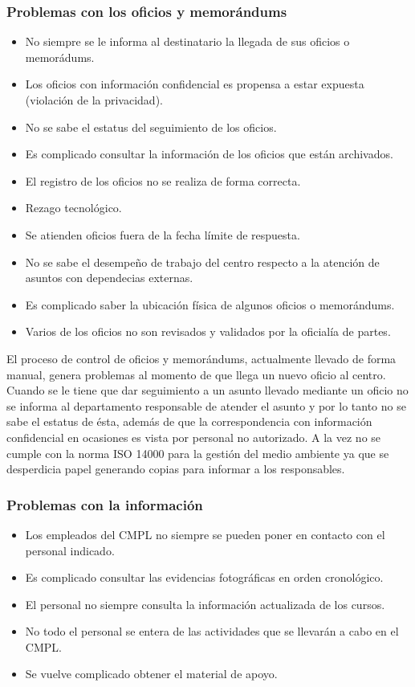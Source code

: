 		\subsubsection{Problemas con los oficios y memorándums}
\begin{itemize}
	\item No siempre se le informa al destinatario la llegada de sus oficios o memorádums.
	\item Los oficios con información confidencial es propensa a estar expuesta (violación de la privacidad).
	\item No se sabe el estatus del seguimiento de los oficios.
	\item Es complicado consultar la información de los oficios que están archivados.
	\item El registro de los oficios no se realiza de forma correcta.
	\item Rezago tecnológico.
	\item Se atienden oficios fuera de la fecha límite de respuesta.
	\item No se sabe el desempeño de trabajo del centro respecto a la atención de asuntos con dependecias externas.
	\item Es complicado saber la ubicación física de algunos oficios o memorándums. %
	\item Varios de los oficios no son revisados y validados por la oficialía de partes.
	\end{itemize}
El proceso de control de oficios y memorándums, actualmente llevado de forma manual, genera problemas al momento de que llega un nuevo oficio al centro. Cuando se le tiene que dar seguimiento a un asunto llevado mediante un oficio no se informa al departamento responsable de atender el asunto y por lo tanto no se sabe el estatus de ésta, además de que la correspondencia con información confidencial en ocasiones es vista por personal no autorizado. A la vez no se cumple con la norma ISO 14000 para la gestión del medio ambiente ya que se desperdicia papel generando copias para informar a los responsables.

		\subsubsection{Problemas con la información}
\begin{itemize}
	
	\item Los empleados del CMPL no siempre se pueden poner en contacto con el personal indicado.
	\item Es complicado consultar las evidencias fotográficas en orden cronológico.
	\item El personal no siempre consulta la información actualizada de los cursos.
	\item No todo el personal se entera de las actividades que se llevarán a cabo en el CMPL.
	\item Se vuelve complicado obtener el material de apoyo.	
	
\end{itemize}

